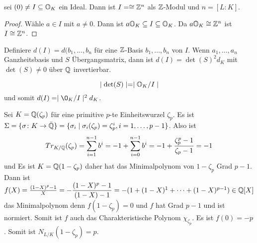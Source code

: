 \begin{Lemma}
    sei \((0)\neq I\subseteq \mathbb{O}_K\) ein Ideal.
    Dann ist \(I=\cong \mathbb{Z}^n\) als \(\mathbb{Z}\)-Modul und \(n=[L:K]\).
\end{Lemma}
\begin{proof}
    Wähle \(a\in I\) mit \(a\neq 0\).
    Dann ist \(a\mathbb{O}_K\subseteq I\subseteq \mathbb{O}_K\).
    Da \(a\mathbb{O}_K\cong \mathbb{Z}^n\) ist \(I\cong \mathbb{Z}^n\).
\end{proof}
\begin{Def}
    Definiere \(d(I)=d(b_1,\dots,b_n\) für eine \(\mathbb{Z}\)-Basis \(b_1,\dots,b_n\) von \(I\).
    Wenn \(a_1,\dots,a_n\) Ganzheitsbasis und \(S\) Übergangsmatrix,
    dann ist \(d(I)=\det(S)^2d_K\) mit \(\det(S)\neq 0\) über \(\mathbb{Q}\) invertierbar.
\end{Def}
\begin{Lemma}
    \[\mid \det(S)\mid =\mid \mathbb{O}_K/I\mid\] und somit 
    \(d(I)=\mid \O_K/I \mid^2d_K\).

\end{Lemma}
\begin{Bsp}
    Sei \(K=\mathbb{Q}(\zeta_p)\) für eine primitive \(p\)-te Einheitswurzel \(\zeta_p\).
    Es ist \(\Sigma=\{\sigma\colon K\to \bar{\mathbb{Q}}\}=\{\sigma_i\mid \sigma_i(\zeta_p)=\zeta_p^i, i=1,\dots,p-1\}\).
    Also ist 
    \[Tr_{K/\mathbb{Q}}(\zeta_p)=\sum_{i=1}^{n-1}b^i=-1+\sum_{i=0}^{n-1}b^i=-1+\dfrac{\zeta_p^p-1}{\zeta_p-1}=-1\] 
    und 
    Es ist \(K=\mathbb{Q}(1-\zeta_p)\) daher hat das Minimalpolynom von \(1-\zeta_p\) Grad \(p-1\).
    Dann ist \(f(X)=\frac{(1-X)^p-1}{X}=-\dfrac{(1-X)^p-1}{(1-X)-1}=-(1+(1-X)^1+\dots+(1-X)^{p-1})\in \mathbb{Q}[X]\) das Minimalpolynom denn \(f(1-\zeta_p)=0\) und 
    \(f\) hat Grad \(p-1\) und ist normiert.
    Somit ist \(f\) auch das Charakteristische Polynom \(\chi_\zeta_p\).
    Es ist \(f(0)=-p\). Somit ist \(N_{L/K}(1-\zeta_p)=p\).
\end{Bsp}
